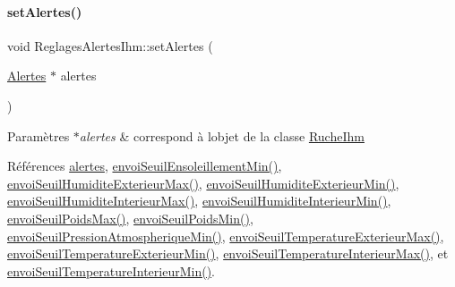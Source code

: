 \mbox{\label{class_reglages_alertes_ihm_aeb0331a6103f944cb15cdd62985ca231}} 
\paragraph{\texorpdfstring{set\+Alertes()}{setAlertes()}}
{\footnotesize\ttfamily void Reglages\+Alertes\+Ihm\+::set\+Alertes (\begin{DoxyParamCaption}\item[{\hyperlink{class_alertes}{Alertes} $\ast$}]{alertes }\end{DoxyParamCaption})}


\begin{DoxyParams}{Paramètres}
{\em $\ast$alertes} & correspond à l\textquotesingle{}objet de la classe \hyperlink{class_ruche_ihm}{Ruche\+Ihm} \\
\hline
\end{DoxyParams}


Références \hyperlink{class_reglages_alertes_ihm_a9afa97e737d3c6a9a28a23fc4bc4beeb}{alertes}, \hyperlink{class_reglages_alertes_ihm_a1ff9b472f2eed0efece54da863497324}{envoi\+Seuil\+Ensoleillement\+Min()}, \hyperlink{class_reglages_alertes_ihm_a1455ae71d0e6c33b7857a23d116f3248}{envoi\+Seuil\+Humidite\+Exterieur\+Max()}, \hyperlink{class_reglages_alertes_ihm_a78cef50cbaaaa46c837230024129c092}{envoi\+Seuil\+Humidite\+Exterieur\+Min()}, \hyperlink{class_reglages_alertes_ihm_ae5e409ea2353cc8e43f312e252b365f9}{envoi\+Seuil\+Humidite\+Interieur\+Max()}, \hyperlink{class_reglages_alertes_ihm_a0d913b26dd22ce48aaebed82a0d3df62}{envoi\+Seuil\+Humidite\+Interieur\+Min()}, \hyperlink{class_reglages_alertes_ihm_a60d8e26bf08448029f4592b10297bdd1}{envoi\+Seuil\+Poids\+Max()}, \hyperlink{class_reglages_alertes_ihm_a6d4642c0f64bad9f070ce7988549f8df}{envoi\+Seuil\+Poids\+Min()}, \hyperlink{class_reglages_alertes_ihm_a78ea60b683ff8bde49d8bd332eb71c57}{envoi\+Seuil\+Pression\+Atmospherique\+Min()}, \hyperlink{class_reglages_alertes_ihm_a626e1067d882bb5c0b86c8e0fb063dcc}{envoi\+Seuil\+Temperature\+Exterieur\+Max()}, \hyperlink{class_reglages_alertes_ihm_a5c4cadb3f7a76cecc0bafaa297b2898a}{envoi\+Seuil\+Temperature\+Exterieur\+Min()}, \hyperlink{class_reglages_alertes_ihm_aa2695b931056a81e6e33ae5e9867b872}{envoi\+Seuil\+Temperature\+Interieur\+Max()}, et \hyperlink{class_reglages_alertes_ihm_a44b51f5bfba7a28ee82b5e08d042c153}{envoi\+Seuil\+Temperature\+Interieur\+Min()}.



